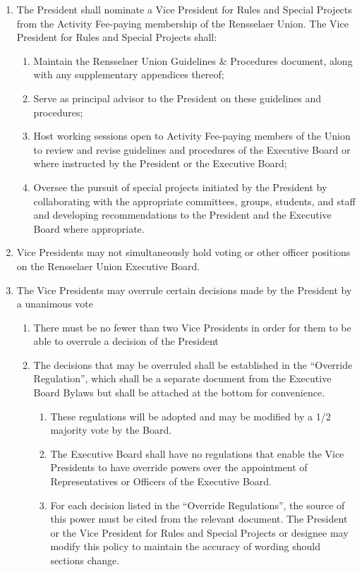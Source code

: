 \documentclass{uniondoc}
\begin{document}
\begin{enumerate}
\begin{enumerate}
  \end{enumerate}
\item The President shall nominate a Vice President for Rules and Special Projects from the Activity Fee-paying membership of the Rensselaer Union. The Vice President for Rules and Special Projects shall:
  \begin{enumerate}
  \item Maintain the Rensselaer Union Guidelines \& Procedures document, along with any supplementary appendices thereof;
  \item Serve as principal advisor to the President on these guidelines and procedures;
  \item Host working sessions open to Activity Fee-paying members of the Union to review and revise guidelines and procedures of the Executive Board or where instructed by the President or the Executive Board;
  \item Oversee the pursuit of special projects initiated by the President by collaborating with the appropriate committees, groups, students, and staff and developing recommendations to the President and the Executive Board where appropriate.
  \end{enumerate}
\item Vice Presidents may not simultaneously hold voting or other officer positions on the Rensselaer Union Executive Board.
\item The Vice Presidents may overrule certain decisions made by the President by a unanimous vote
  \begin{enumerate}
  \item There must be no fewer than two Vice Presidents in order for them to be able to overrule a decision of the President
  \item The decisions that may be overruled shall be established in the ``Override Regulation'', which shall be a separate document from the Executive Board Bylaws but shall be attached at the bottom for convenience.
    \begin{enumerate}
    \item These regulations will be adopted and may be modified by a 1/2 majority vote by the Board.
    \item The Executive Board shall have no regulations that enable the Vice Presidents to have override powers over the appointment of Representatives or Officers of the Executive Board.
    \item For each decision listed in the ``Override Regulations'', the source of this power must be cited from the relevant document. The President or the Vice President for Rules and Special Projects or designee may modify this policy to maintain the accuracy of wording should sections change.

\end{enumerate}
\end{enumerate}
\end{enumerate}
\end{document}
